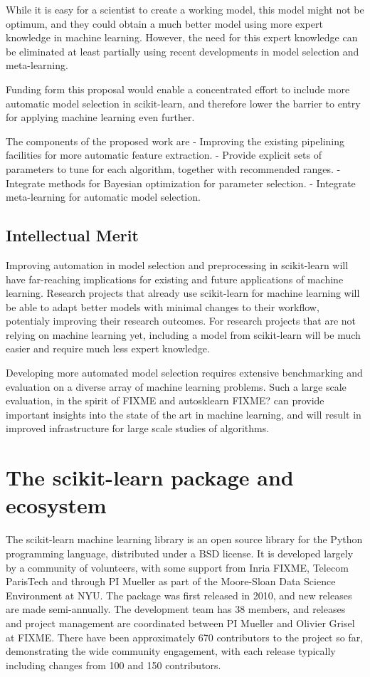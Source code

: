 While it is easy for a scientist to create a working model, this model might not
be optimum, and they could obtain a much better model using more expert knowledge
in machine learning.
However, the need for this expert knowledge can be eliminated at least partially
using recent developments in model selection and meta-learning.

Funding form this proposal would enable a concentrated effort to include more
automatic model selection in scikit-learn, and therefore lower the barrier to
entry for applying machine learning even further.

The components of the proposed work are
- Improving the existing pipelining facilities for more automatic feature extraction.
- Provide explicit sets of parameters to tune for each algorithm, together with recommended ranges.
- Integrate methods for Bayesian optimization for parameter selection.
- Integrate meta-learning for automatic model selection.

\subsection{Intellectual Merit}
Improving automation in model selection and preprocessing in scikit-learn will have far-reaching
implications for existing and future applications of machine learning.
Research projects that already use scikit-learn for machine learning will be able to adapt better
models with minimal changes to their workflow, potentialy improving their research outcomes.
For research projects that are not relying on machine learning yet, including a model
from scikit-learn will be much easier and require much less expert knowledge.

Developing more automated model selection requires extensive benchmarking and evaluation
on a diverse array of machine learning problems. Such a large scale evaluation,
in the spirit of FIXME and autosklearn FIXME\@? can provide important insights into
the state of the art in machine learning, and will result in improved infrastructure
for large scale studies of algorithms.

\section{The scikit-learn package and ecosystem}
The scikit-learn machine learning library is an open source library for the
Python programming language, distributed under a BSD license.
It is developed largely by a community of volunteers, with some support from
Inria FIXME, Telecom ParisTech and through PI Mueller as part of the
Moore-Sloan Data Science Environment at NYU\@.
The package was first released in 2010, and new releases are made semi-annually.
The development team has 38 members, and releases and project management are
coordinated between PI Mueller and Olivier Grisel at FIXME\@.
There have been approximately 670 contributors to the project so far, demonstrating
the wide community engagement, with each release typically including changes
from 100 and 150 contributors.

